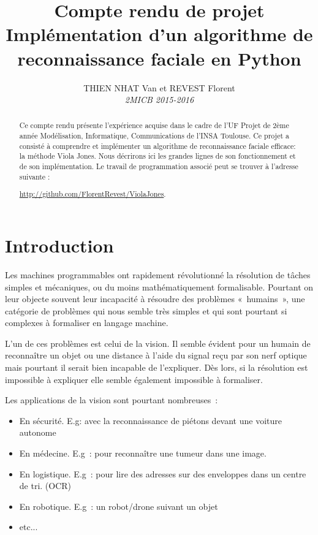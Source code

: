 \documentclass[a4paper,11pt]{report}
\title{\textbf{Compte rendu de projet} \\ Implémentation d’un algorithme de reconnaissance faciale en Python}
\author{THIEN NHAT Van et REVEST Florent\\\textit{2MICB 2015-2016}}
\begin{document}
\maketitle
\tableofcontents

\begin{abstract}
	Ce compte rendu présente l'expérience acquise dans le cadre de l'UF Projet de 2ème année Modélisation, Informatique, Communications de l'INSA Toulouse. Ce projet a consisté à comprendre et implémenter un algorithme de reconnaissance faciale efficace: la méthode Viola Jones. Nous décrirons ici les grandes lignes de son fonctionnement et de son implémentation. Le travail de programmation associé peut se trouver à l'adresse suivante :

\href{http://github.com/FlorentRevest/ViolaJones}{http://github.com/FlorentRevest/ViolaJones}.
\end{abstract}

\chapter{Introduction}
	Les machines programmables ont rapidement révolutionné la résolution de tâches simples et mécaniques, ou du moins mathématiquement formalisable. Pourtant on leur objecte souvent leur incapacité à résoudre des problèmes « humains », une catégorie de problèmes qui nous semble très simples et qui sont pourtant si complexes à formaliser en langage machine.

	L’un de ces problèmes est celui de la vision. Il semble évident pour un humain de reconnaître un objet ou une distance à l’aide du signal reçu par son nerf optique mais pourtant il serait bien incapable de l’expliquer. Dès lors, si la résolution est impossible à expliquer elle semble également impossible à formaliser.

	Les applications de la vision sont pourtant nombreuses : 
\begin{itemize}
\item En sécurité. E.g: avec la reconnaissance de piétons devant une voiture autonome
\item En médecine. E.g : pour reconnaître une tumeur dans une image.
\item En logistique. E.g : pour lire des adresses sur des enveloppes dans un centre de tri. (OCR)
\item En robotique. E.g : un robot/drone suivant un objet
\item etc...
\end{itemize}
\end{document}
